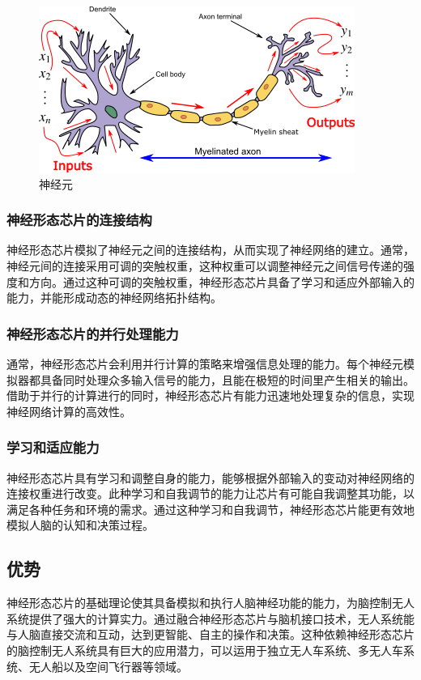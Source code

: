 \documentclass{thuemp}
\begin{document}
\begin{figure}[h]
	\centering
    \includegraphics[width=0.8\linewidth]{./img/sjy.png}
    \caption{神经元}
\end{figure}

\subsubsection{神经形态芯片的连接结构}
神经形态芯片模拟了神经元之间的连接结构，从而实现了神经网络的建立。通常，神经元间的连接采用可调的突触权重，这种权重可以调整神经元之间信号传递的强度和方向。通过这种可调的突触权重，神经形态芯片具备了学习和适应外部输入的能力，并能形成动态的神经网络拓扑结构。

\subsubsection{神经形态芯片的并行处理能力}
通常，神经形态芯片会利用并行计算的策略来增强信息处理的能力。每个神经元模拟器都具备同时处理众多输入信号的能力，且能在极短的时间里产生相关的输出。借助于并行的计算进行的同时，神经形态芯片有能力迅速地处理复杂的信息，实现神经网络计算的高效性。

\subsubsection{学习和适应能力}
神经形态芯片具有学习和调整自身的能力，能够根据外部输入的变动对神经网络的连接权重进行改变。此种学习和自我调节的能力让芯片有可能自我调整其功能，以满足各种任务和环境的需求。通过这种学习和自我调节，神经形态芯片能更有效地模拟人脑的认知和决策过程。

\subsection{优势}
神经形态芯片的基础理论使其具备模拟和执行人脑神经功能的能力，为脑控制无人系统提供了强大的计算实力。通过融合神经形态芯片与脑机接口技术，无人系统能与人脑直接交流和互动，达到更智能、自主的操作和决策。这种依赖神经形态芯片的脑控制无人系统具有巨大的应用潜力，可以运用于独立无人车系统、多无人车系统、无人船以及空间飞行器等领域。
\end{document}
